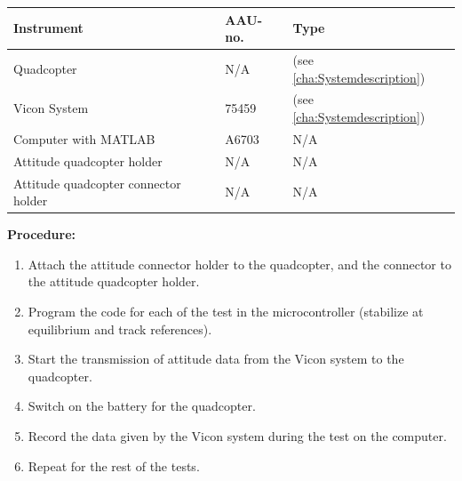\begin{table}[H]
	\begin{tabular}{|l|l|p{4.3cm}|}
		\hline%
		\textbf{Instrument}   &  \textbf{AAU-no.}  &  \textbf{Type}                       \\
		\hline%
		Quadcopter    	&  N/A 						&  (see \autoref{cha:Systemdescription}) 		      	 \\
		\hline%
	    Vicon System			& 75459                 &  (see \autoref{cha:Systemdescription})                  \\
		\hline%
		Computer with MATLAB       &  A6703		 & N/A     \\
		\hline%
		Attitude quadcopter holder      &  N/A		 & N/A     \\
		\hline%
		Attitude quadcopter connector holder   &  N/A		 & N/A     \\
		\hline%
	\end{tabular}
\end{table}
	
\textbf{Procedure:}

\begin{enumerate}
	\item Attach the attitude connector holder to the quadcopter, and the connector to the attitude quadcopter holder.
    \item Program the code for each of the test in the microcontroller (stabilize at equilibrium and track references).
	\item Start the transmission of attitude data from the Vicon system to the quadcopter.
	\item Switch on the battery for the quadcopter.
	\item Record the data given by the Vicon system during the test on the computer.
    \item Repeat for the rest of the tests.
\end{enumerate}
 
